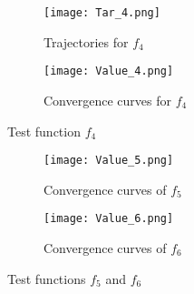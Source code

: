 \begin{figure}[H]
\centering
\begin{subfigure}[b]{0.3\textwidth}
    \centering
    \texttt{[image: Tar\_4.png]}
    \caption{Trajectories for $f_4$}
    \label{f4_trajectories}
\end{subfigure}
\begin{subfigure}[b]{0.3\textwidth}
    \centering
    \texttt{[image: Value\_4.png]}
    \caption{Convergence curves for $f_4$}
    \label{f4_convergence}
\end{subfigure}
\caption{Test function $f_4$}
\label{f_4}
\end{figure}

\begin{figure}[H]
\centering
\begin{subfigure}[b]{0.3\textwidth}
    \centering
    \texttt{[image: Value\_5.png]}
    \caption{Convergence curves of $f_5$}
    \label{f5_convergence}
\end{subfigure}
\begin{subfigure}[b]{0.3\textwidth}
    \centering
    \texttt{[image: Value\_6.png]}
    \caption{Convergence curves of $f_6$}
    \label{f6_convergence}
\end{subfigure}
\caption{Test functions $f_5$ and $f_6$}
\label{f_56}
\end{figure}





\begin{comment}
\subsection{Single-agent potential game}

\[
-\ln\left(e^{-10(x-0.3)^2-20(y-0.5)^2-30(z-0.2)^2}+e^{-30(x-0.4)^2-20(y-0.2)^2-36(z-0.4)^2}\right)+y
\]

\subsection{Multi-agent potential game}
\end{comment}












